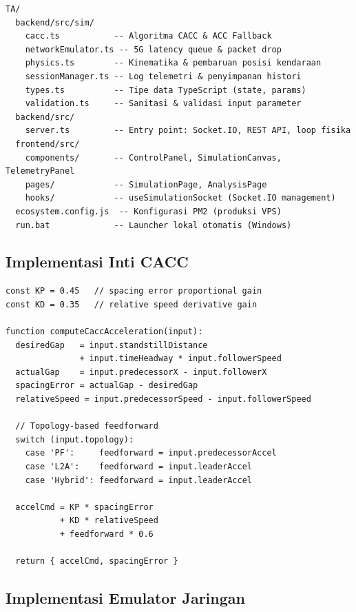 \documentclass[12pt,a4paper]{article}
\begin{document}
\begin{lstlisting}[style=codeStyle, caption=Struktur Folder Proyek]
TA/
  backend/src/sim/
    cacc.ts           -- Algoritma CACC & ACC Fallback
    networkEmulator.ts -- 5G latency queue & packet drop
    physics.ts        -- Kinematika & pembaruan posisi kendaraan
    sessionManager.ts -- Log telemetri & penyimpanan histori
    types.ts          -- Tipe data TypeScript (state, params)
    validation.ts     -- Sanitasi & validasi input parameter
  backend/src/
    server.ts         -- Entry point: Socket.IO, REST API, loop fisika
  frontend/src/
    components/       -- ControlPanel, SimulationCanvas, TelemetryPanel
    pages/            -- SimulationPage, AnalysisPage
    hooks/            -- useSimulationSocket (Socket.IO management)
  ecosystem.config.js  -- Konfigurasi PM2 (produksi VPS)
  run.bat             -- Launcher lokal otomatis (Windows)
\end{lstlisting}

\subsection{Implementasi Inti CACC}

\begin{lstlisting}[style=codeStyle, caption=Inti Algoritma CACC (cacc.ts)]
const KP = 0.45   // spacing error proportional gain
const KD = 0.35   // relative speed derivative gain

function computeCaccAcceleration(input):
  desiredGap   = input.standstillDistance
               + input.timeHeadway * input.followerSpeed
  actualGap    = input.predecessorX - input.followerX
  spacingError = actualGap - desiredGap
  relativeSpeed = input.predecessorSpeed - input.followerSpeed

  // Topology-based feedforward
  switch (input.topology):
    case 'PF':     feedforward = input.predecessorAccel
    case 'L2A':    feedforward = input.leaderAccel
    case 'Hybrid': feedforward = input.leaderAccel

  accelCmd = KP * spacingError
           + KD * relativeSpeed
           + feedforward * 0.6

  return { accelCmd, spacingError }
\end{lstlisting}

\subsection{Implementasi Emulator Jaringan}
\end{document}
